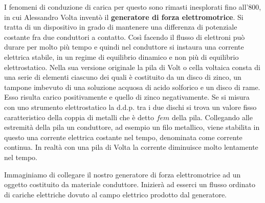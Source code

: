 I fenomeni di conduzione di carica per questo sono rimasti inesplorati fino all'800, in cui Alessandro Volta inventò il \textbf{generatore di forza elettromotrice}.
Si tratta di un dispositivo in grado di mantenere una differenza di potenziale costante fra due conduttori a contatto. Così facendo il flusso di elettroni può durare per molto più tempo e quindi nel conduttore si instaura una corrente elettrica stabile, in un regime di equilibrio dinamico e non più di equilibrio elettrostatico. Nella sua versione originale la pila di Volt o cella voltaica consta di una serie di elementi ciascuno dei quali è costituito da un disco di zinco, un tampone imbevuto di una soluzione acquosa di acido solforico e un disco di rame. Esso risulta carico positivamente e quello di zinco negativamente. Se si misura con uno strumento elettrostatico la d.d.p. tra i due dischi si trova un valore fisso caratteristico della coppia di metalli che è detto $fem$ della pila. Collegando alle estremità della pila un conduttore, ad esempio un filo metallico, viene stabilita in questo una corrente elettrica costante nel tempo, denominata come corrente continua. In realtà con una pila di Volta la corrente diminuisce molto lentamente nel tempo.

Immaginiamo di collegare il nostro generatore di forza elettromotrice ad un oggetto costituito da materiale conduttore. Inizierà ad esserci un flusso ordinato di cariche elettriche dovuto al campo elettrico prodotto dal generatore.

